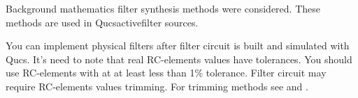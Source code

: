 Background mathematics filter synthesis methods were considered. These methods 
are used in Qucsactivefilter sources. 

You can implement physical filters after filter circuit is built and simulated 
with Qucs. It's need to note that real RC-elements values have tolerances. You 
should use RC-elements with at at least less than 1\% tolerance. Filter circuit 
may require RC-elements values trimming. For trimming methods see 
\cite {johnson} and \cite{Moschytz}. 






